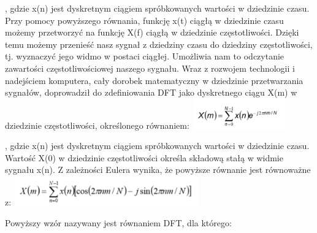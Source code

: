 \documentclass[a4paper,titleauthor]{mwart}
\begin{document}
, gdzie x(n) jest dyskretnym ciągiem spróbkowanych wartości w dziedzinie czasu.\newline\newline
Przy pomocy powyższego równania, funkcję x(t) ciągłą w dziedzinie czasu możemy przetworzyć na funkcję X(f) ciągłą w dziedzinie częstotliwości. Dzięki temu możemy przenieść nasz sygnał z dziedziny czasu do dziedziny częstotliwości, tj. wyznaczyć jego widmo w postaci ciągłej. Umożliwia nam to odczytanie zawartości częstotliwościowej naszego sygnału.
\newline\newline
Wraz z rozwojem technologii i nadejściem komputera, cały dorobek matematyczny w dziedzinie przetwarzania sygnałów, doprowadził do zdefiniowania DFT jako dyskretnego ciągu X(m) w dziedzinie częstotliwości, określonego równaniem:
\newline
\includegraphics[width=0.3\textwidth]{fourier2}

, gdzie x(n) jest dyskretnym ciągiem spróbkowanych wartości w dziedzinie czasu. \newline\newline
Wartość X(0) w dziedzinie częstotliwości określa składową stałą w widmie sygnału x(n).
Z zależności Eulera wynika, że powyższe równanie jest równoważne z: 
\newline
\includegraphics[width=0.6\textwidth]{fourier3}

Powyższy wzór nazywany jest równaniem DFT, dla którego:
\end{document}
